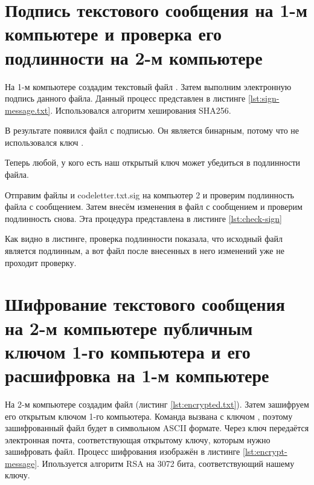 \section{Подпись текстового сообщения на 1-м компьютере и проверка его подлинности на 2-м компьютере}

На 1-м компьютере создадим текстовый файл . Затем выполним электронную подпись данного файла. Данный процесс представлен в листинге \ref{lst:sign-message.txt}. Использовался алгоритм хеширования SHA256.





В результате появился файл  с подписью. Он является бинарным, потому что не использовался ключ .

Теперь любой, у кого есть наш открытый ключ может убедиться в подлинности файла.

Отправим файлы  и code{letter.txt.sig} на компьютер 2 и проверим подлинность файла с сообщением. Затем внесём изменения в файл с сообщением и проверим подлинность снова. Эта процедура представлена в листинге \ref{lst:check-sign}



Как видно в листинге, проверка подлинности показала, что исходный файл является подлинным, а вот файл после внесенных в него изменений уже не проходит проверку.

\section{Шифрование текстового сообщения на 2-м компьютере публичным ключом 1-го компьютера и его расшифровка на 1-м компьютере}

На 2-м компьютере создадим файл  (листинг \ref{lst:encrypted.txt}). Затем зашифруем его открытым ключом 1-го компьютера. Команда вызвана с ключом , поэтому зашифрованный файл будет в символьном ASCII формате. Через ключ  передаётся электронная почта, соответствующая открытому ключу, которым нужно зашифровать файл. Процесс шифрования изображён в листинге \ref{lst:encrypt-message}. Ипользуется алгоритм RSA на 3072 бита, соответствующий нашему ключу.

